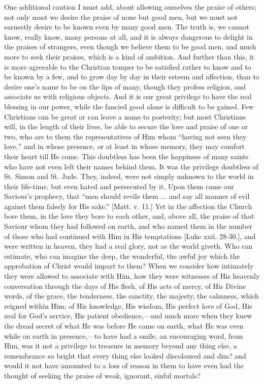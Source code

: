One additional caution I must add, about allowing ourselves the
praise of others; not only must we desire the praise of none but good
men, but we must not earnestly desire to be known even by many good
men. The truth is, we cannot know, really know, many persons at all,
and it is always dangerous to delight in the praises of strangers,
even though we believe them to be good men, and much more to seek
their praises, which is a kind of ambition. And further than this, it
is more agreeable to the Christian temper to be satisfied rather to
know and to be known by a few, and to grow day by day in their esteem
and affection, than to desire one's name to be on the lips of many,
though they profess religion, and associate us with religious objects.
And it is our great privilege to have the real blessing in our power,
while the fancied good alone is difficult to be gained. Few Christians
can be great or can leave a name to posterity; but most Christians
will, in the length of their lives, be able to secure the love and
praise of one or two, who are to them the representatives of Him whom
``having not seen they love,'' and in whose presence, or at
least in whose memory, they may comfort their heart till He come. This
doubtless has been the happiness of many saints who have not even left
their names behind them. It was the privilege doubtless of St. Simon
and St. Jude. They, indeed, were not simply unknown to the world in
their life-time, but even hated and persecuted by it. Upon them came
our Saviour's prophecy, that ``men should revile them ... and say
all manner of evil against them falsely for His sake.'' [Matt. v.
11.] Yet in the affection the Church bore them, in the love they bore
to each other, and, above all, the praise of that Saviour whom they
had followed on earth, and who named them in the number of those who
had continued with Him in His temptations [Luke xxii. 28-30.], and
were written in heaven, they had a real glory, not as the world giveth.
Who can estimate, who can imagine the deep, the wonderful, the awful
joy which the approbation of Christ would impart to them? When we
consider how intimately they were allowed to associate with Him, how
they were witnesses of His heavenly conversation through the days of
His flesh, of His acts of mercy, of His Divine words, of the grace,
the tenderness, the sanctity, the majesty, the calmness, which reigned
within Him; of His knowledge, His wisdom, His perfect love of God, His
zeal for God's service, His patient obedience,—and much more when
they knew the dread secret of what He was before He came on earth,
what He was even while on earth in presence,—to have had a smile, an
encouraging word, from Him, was it not a privilege to treasure in
memory beyond any thing else, a remembrance so bright that every thing
else looked discoloured and dim? and would it not have amounted to a
loss of reason in them to have even had the thought of seeking the
praise of weak, ignorant, sinful mortals?

